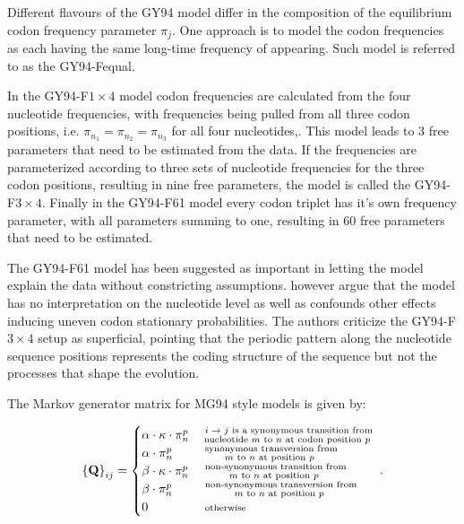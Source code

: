 Different flavours of the GY94 model differ in the composition of the equilibrium codon frequency parameter $\pi_{j}$.
One approach is to model the codon frequencies as each having the same long-time frequency of appearing. 
Such model is referred to as the GY94-Fequal.

In the GY94-F$1\times4$ model codon frequencies are calculated from the four nucleotide frequencies, with frequencies being pulled from all three codon positions, i.e. $\pi_{n_{1}}=\pi_{n_{2}}=\pi_{n_{3}}$ for all four nucleotides,.
This model leads to 3 free parameters that need to be estimated from the data. 
If the frequencies are parameterized according to three sets of nucleotide frequencies for the three codon positions, resulting in nine free parameters, the model is called the GY94-F$3\times4$.
Finally in the GY94-F61 model every codon triplet has it's own frequency parameter, with all parameters summing to one, resulting in 60 free parameters that need to be estimated.

The GY94-F61 model has been suggested as important in letting the model explain the data without constricting assumptions.
\citet{Rodrigue2008} however argue that the model has no interpretation on the nucleotide level as well as confounds other effects inducing uneven codon stationary probabilities.
The authors criticize the GY94-F$3\times4$ setup as superficial, pointing that the periodic pattern along the nucleotide sequence positions represents the coding structure of the sequence but not the processes that shape the evolution.

The Markov generator matrix for MG94 style models \citep{Muse1994} is given by:

\begin{equation}
\left\{ \mathbf{Q}\right\} _{ij}=\begin{cases}
\alpha\cdot\kappa\cdot\pi_{n}^{p} & \substack{ \text{ \ensuremath{i\rightarrow j} is a synonymous transition from } \\ \text{nucleotide \ensuremath{m} to \ensuremath{n} at codon position \ensuremath{p} } } \\
\alpha\cdot\pi_{n}^{p} & \substack{ \text{ synonymous transversion from } \\ \text{\ensuremath{m} to \ensuremath{n} at position \ensuremath{p} } } \\
\beta\cdot\kappa\cdot\pi_{n}^{p} & \substack{ \text{ non-synonymous transition from } \\ \text{\ensuremath{m} to \ensuremath{n} at position \ensuremath{p} } } \\
\beta\cdot\pi_{n}^{p} & \substack{ \text{ non-synonymous transversion from } \\ \text{\ensuremath{m} to \ensuremath{n} at position \ensuremath{p} } } \\
0 & \substack{ \text{ otherwise}}
\end{cases}.
\label{eq:mg94}
\end{equation}

